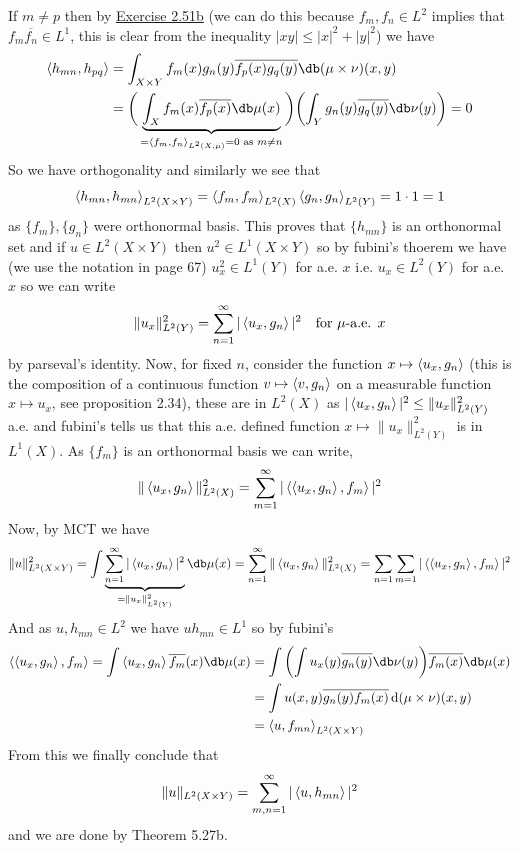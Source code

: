 \documentclass[12pt,a4paper]{article}
\begin{document}
\begin{solution}
    If $m\neq p$ then by \hyperref[prob:2-51]{Exercise 2.51b} (we can do this because $f_m,f_n\in L^2$ implies that $f_m \overline{f_n}\in L^1$, this is clear from the inequality $|xy|\leq|x|^2+|y|^2$) we have 
    \[
        \begin{aligned}
            \ipp{h_{mn},h_{pq}} &= \int_{X\times Y}f_m(x)g_n(y) \overline{f_p(x)g_q(y)}\db(\mu\times\nu)(x,y) \\
                                &= \bigg(\underbrace{\int_Xf_m(x) \overline{f_p(x)}\db\mu(x)}_{=\ipp{f_m,f_n}_{L^2(X,\mu)}=0\text{ as }m\neq n}\bigg)\qty(\int_Yg_n(y) \overline{g_q(y)}\db\nu(y)) =0
        \end{aligned}
    \]
    So we have orthogonality and similarly we see that 
    \[
        \left\langle h_{mn},h_{mn}\right\rangle_{L^2(X\times Y)}=\left\langle f_m,f_m\right\rangle_{L^2(X)}\left\langle g_n,g_n\right\rangle_{L^2(Y)}=1\cdot 1=1
    \]
    as $\{f_m\},\{g_n\}$ were orthonormal basis. 
    This proves that $\{h_{mn}\}$ is an orthonormal set and if $u\in L^2(X\times Y)$ then $u^2\in L^1(X\times Y)$ so by fubini's thoerem we have (we use the notation in page 67) $u_x^2\in L^1(Y)$ for a.e. $x$ i.e. $u_x\in L^2(Y)$ for a.e. $x$ so we can write 
    \[
        \|u_x\|_{L^2(Y)}^2=\sum_{n=1}^\infty|\left\langle u_x,g_n\right\rangle|^2\quad\text{for }\mu\text{-a.e. }x
    \] 
    by parseval's identity. 
    Now, for fixed $n$, consider the function $x\mapsto\left\langle u_x,g_n\right\rangle$ (this is the composition of a continuous function $v\mapsto\left\langle v,g_n\right\rangle$ on a measurable function $x\mapsto u_x$, see proposition 2.34), these are in $L^2(X)$ as $|\left\langle u_x,g_n\right\rangle|^2\leq\|u_x\|_{L^2(Y)}^2$ a.e. and fubini's tells us that this a.e. defined function $x\mapsto\|u_x\|_{L^2(Y)}^2$ is in $L^1(X).$ 
    As $\{f_m\}$ is an orthonormal basis we can write, 
    \[
        \|\left\langle u_x,g_n\right\rangle\|_{L^2(X)}^2=\sum_{m=1}^\infty|\left\langle\left\langle u_x,g_n\right\rangle,f_m\right\rangle|^2
    \]
    Now, by MCT we have 
    \[
        \|u\|_{L^2(X\times Y)}^2=\int\underbrace{\sum_{n=1}^\infty|\ipp{u_x,g_n}|^2}_{=\|u_x\|_{L^2(Y)}^2}\db\mu(x)=\sum_{n=1}^\infty\|\ipp{u_x,g_n}\|_{L^2(X)}^2=\sum_{n=1}\sum_{m=1}|\ipp{\ipp{u_x,g_n},f_m}|^2
    \]
    And as $u,h_{mn}\in L^2$ we have $uh_{mn}\in L^1$ so by fubini's 
    \[
       \begin{aligned}
           \ipp{\ipp{u_x,g_n},f_m}=\int\ipp{u_x,g_n} \overline{f_m}(x)\db\mu(x) &= \int\qty(\int u_x(y) \overline{g_n(y)}\db\nu(y)) \overline{f_m(x)}\db\mu(x) \\
                                                                               &= \int u(x,y) \overline{g_n(y)f_m(x)}\d(\mu\times\nu)(x,y) \\
                                                                               &= \ipp{u,f_{mn}}_{L^2(X\times Y)}
       \end{aligned}
    \]
    From this we finally conclude that 
    \[
        \|u\|_{L^2(X\times Y)}=\sum_{m,n=1}^\infty|\left\langle u,h_{mn}\right\rangle|^2
    \]
    and we are done by Theorem 5.27b.  
\end{solution}
\end{document}
